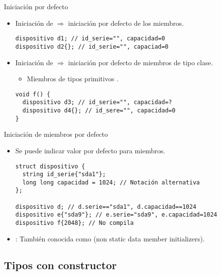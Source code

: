 \begin{frame}[t,fragile]{Iniciación por defecto}
\begin{itemize}
    \item Iniciación de  $\Rightarrow$ 
          iniciación por defecto de  los miembros.
\begin{lstlisting}
dispositivo d1; // id_serie="", capacidad=0
dispositivo d2{}; // id_serie="", capaciad=0
\end{lstlisting}

    \item Iniciación de  $\Rightarrow$ 
          iniciación por defecto  de miembros de tipo clase.
        \begin{itemize}
          \item Miembros de tipos primitivos .
        \end{itemize}
\begin{lstlisting}
void f() {
  dispositivo d3; // id_serie="", capacidad=?
  dispositivo d4{}; // id_sere="", capacidad=0
}
\end{lstlisting}
\end{itemize}
\end{frame}

\begin{frame}[t,fragile]{Iniciación de miembros por defecto}
\begin{itemize}  
  \item Se puede indicar valor por defecto para miembros.
\begin{lstlisting}
struct dispositivo {
  string id_serie{"sda1"};
  long long capacidad = 1024; // Notación alternativa
};

dispositivo d; // d.serie=="sda1", d.capacidad==1024
dispositivo e{"sda9"}; // e.serie="sda9", e.capacidad=1024
dispositivo f{2048}; // No compila
\end{lstlisting}

  \item {}: También conocida como 
        (non static data member initializers).
\end{itemize}
\end{frame}

\subsection{Tipos con constructor}


